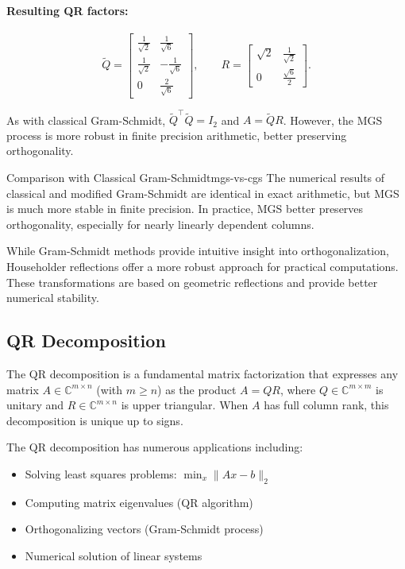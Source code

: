 \documentclass[../../main.tex]{subfiles}
\begin{document}
\paragraph{Resulting QR factors:}
\[
    \widetilde{Q} = \begin{bmatrix}
        \frac{1}{\sqrt{2}} & \frac{1}{\sqrt{6}}  \\
        \frac{1}{\sqrt{2}} & -\frac{1}{\sqrt{6}} \\
        0                  & \frac{2}{\sqrt{6}}
    \end{bmatrix}, \qquad
    R = \begin{bmatrix}
        \sqrt{2} & \frac{1}{\sqrt{2}} \\
        0        & \frac{\sqrt{6}}{2}
    \end{bmatrix}.
\]

As with classical Gram-Schmidt, $\widetilde{Q}^\top \widetilde{Q} = I_2$ and $A = \widetilde{Q} R$. However, the MGS process is more robust in finite precision arithmetic, better preserving orthogonality.

\begin{remark}{Comparison with Classical Gram-Schmidt}{mgs-vs-cgs}
    The numerical results of classical and modified Gram-Schmidt are identical in exact arithmetic, but MGS is much more stable in finite precision. In practice, MGS better preserves orthogonality, especially for nearly linearly dependent columns.
\end{remark}

While Gram-Schmidt methods provide intuitive insight into orthogonalization, Householder reflections offer a more robust approach for practical computations.
These transformations are based on geometric reflections and provide better numerical stability.

\subsection{QR Decomposition}
The QR decomposition is a fundamental matrix factorization that expresses any matrix $A \in \mathbb{C}^{m \times n}$ (with $m \geq n$) as the product $A = QR$, where $Q \in \mathbb{C}^{m \times m}$ is unitary and $R \in \mathbb{C}^{m \times n}$ is upper triangular. When $A$ has full column rank, this decomposition is unique up to signs.

The QR decomposition has numerous applications including:
\begin{itemize}
    \item Solving least squares problems: $\min_x \|Ax - b\|_2$
    \item Computing matrix eigenvalues (QR algorithm)
    \item Orthogonalizing vectors (Gram-Schmidt process)
    \item Numerical solution of linear systems
\end{itemize}
\end{document}
